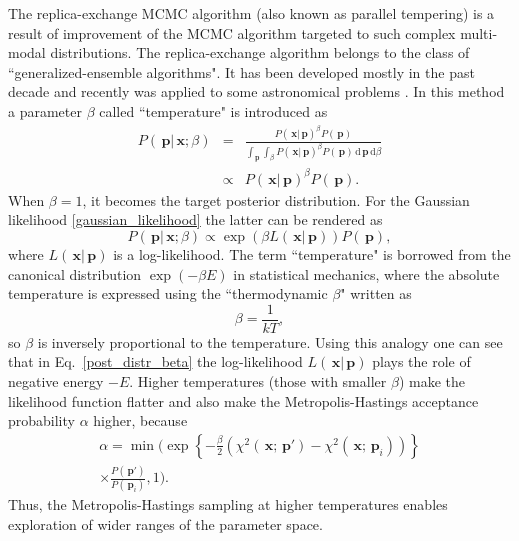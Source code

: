 \documentclass[preprint2]{aastex}
\newcommand{\ud}{\,\mathrm{d}}
\newcommand{\bp}{\,\mathbf{p}}
\newcommand{\bx}{\,\mathbf{x}}
\begin{document}
The replica-exchange MCMC algorithm (also known as parallel tempering) is a result of improvement of the MCMC algorithm targeted to such complex multi-modal distributions. The replica-exchange algorithm belongs to the class of ``generalized-ensemble algorithms". It has been developed mostly in the past decade and recently was applied to some astronomical problems \citep{Gregory2005,Varghese_etal2011,Benneke_Seager2012}. In this method a parameter $\beta$ called ``temperature" is introduced as
\begin{eqnarray}
  \label{post_distr_beta}
  P(\bp|\bx;\beta) &=&  \frac{P(\bx|\bp)^\beta P(\bp)}{\int_{\bp} \int_{\beta} 
                              P(\bx|\bp)^\beta P(\bp) \ud \bp \ud \beta} \nonumber \\
      &\propto& P(\bx|\bp)^\beta P(\bp)  .
\end{eqnarray}
When $\beta=1$, it becomes the target posterior distribution. For the Gaussian likelihood \eqref{gaussian_likelihood} the latter can be rendered as
\begin{equation}
      P(\bp|\bx;\beta) \propto \exp \left( \beta L(\bx|\bp) \right) P(\bp),
\end{equation}
where $L(\bx|\bp)$ is a log-likelihood. The term ``temperature" is borrowed from the canonical distribution $\exp \left( -\beta E \right)$ in statistical mechanics, where the absolute temperature is expressed using the ``thermodynamic $\beta$" written as 
\begin{equation}
	\beta = \frac{1}{kT},
\end{equation}
so $\beta$ is inversely proportional to the temperature. Using this analogy one can see that in Eq.~\eqref{post_distr_beta}  the log-likelihood $L(\bx|\bp)$ plays the role of negative energy $-E$. Higher temperatures (those with smaller $\beta$) make the likelihood function flatter and also make the Metropolis-Hastings acceptance probability $\alpha$ higher, because
\begin{eqnarray}
  \label{accept_probab_beta}
  \alpha = \min \biggl( \exp \left\lbrace -\frac{\beta}{2}\left( \chi^2(\bx;\bp') - \chi^2(\bx;\bp_i) \right)
              \right\rbrace \nonumber \\
         \times  \frac{P(\bp')} {P(\bp_i)}, 1 \biggr).  
\end{eqnarray}
Thus, the Metropolis-Hastings sampling at higher temperatures enables exploration of wider ranges of the parameter space. 
\end{document}
